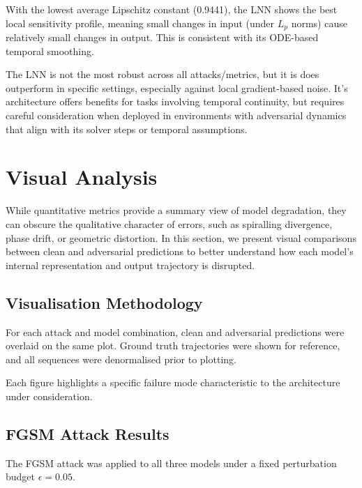 With the lowest average Lipschitz constant (0.9441), the LNN shows the best local sensitivity profile, meaning small changes in input (under $L_p$ norms) cause relatively small changes in output. This is consistent with its ODE-based temporal smoothing.

The LNN is not the most robust across all attacks/metrics, but it is does outperform in specific settings, especially against local gradient-based noise. It's architecture offers benefits for tasks involving temporal continuity, but requires careful consideration when deployed in environments with adversarial dynamics that align with its solver steps or temporal assumptions.

\section{Visual Analysis}

While quantitative metrics provide a summary view of model degradation, they can obscure the qualitative character of errors, such as spiralling divergence, phase drift, or geometric distortion. In this section, we present visual comparisons between clean and adversarial predictions to better understand how each model's internal representation and output trajectory is disrupted.

\subsection*{Visualisation Methodology}

For each attack and model combination, clean and adversarial predictions were overlaid on the same plot.
Ground truth trajectories were shown for reference, and all sequences were denormalised prior to plotting.

Each figure highlights a specific failure mode characteristic to the architecture under consideration.

\subsection*{FGSM Attack Results}

The FGSM attack was applied to all three models under a fixed perturbation budget $\epsilon = 0.05$. 

